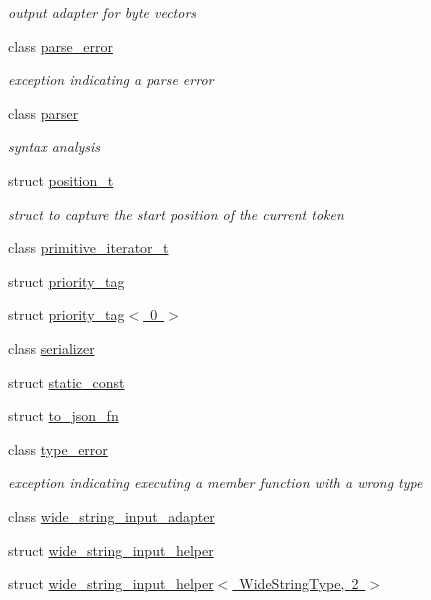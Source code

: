 \begin{DoxyCompactItemize}
\begin{DoxyCompactList}\small\item\em output adapter for byte vectors \end{DoxyCompactList}\item 
class \mbox{\hyperlink{classnlohmann_1_1detail_1_1parse__error}{parse\+\_\+error}}
\begin{DoxyCompactList}\small\item\em exception indicating a parse error \end{DoxyCompactList}\item 
class \mbox{\hyperlink{classnlohmann_1_1detail_1_1parser}{parser}}
\begin{DoxyCompactList}\small\item\em syntax analysis \end{DoxyCompactList}\item 
struct \mbox{\hyperlink{structnlohmann_1_1detail_1_1position__t}{position\+\_\+t}}
\begin{DoxyCompactList}\small\item\em struct to capture the start position of the current token \end{DoxyCompactList}\item 
class \mbox{\hyperlink{classnlohmann_1_1detail_1_1primitive__iterator__t}{primitive\+\_\+iterator\+\_\+t}}
\item 
struct \mbox{\hyperlink{structnlohmann_1_1detail_1_1priority__tag}{priority\+\_\+tag}}
\item 
struct \mbox{\hyperlink{structnlohmann_1_1detail_1_1priority__tag_3_010_01_4}{priority\+\_\+tag$<$ 0 $>$}}
\item 
class \mbox{\hyperlink{classnlohmann_1_1detail_1_1serializer}{serializer}}
\item 
struct \mbox{\hyperlink{structnlohmann_1_1detail_1_1static__const}{static\+\_\+const}}
\item 
struct \mbox{\hyperlink{structnlohmann_1_1detail_1_1to__json__fn}{to\+\_\+json\+\_\+fn}}
\item 
class \mbox{\hyperlink{classnlohmann_1_1detail_1_1type__error}{type\+\_\+error}}
\begin{DoxyCompactList}\small\item\em exception indicating executing a member function with a wrong type \end{DoxyCompactList}\item 
class \mbox{\hyperlink{classnlohmann_1_1detail_1_1wide__string__input__adapter}{wide\+\_\+string\+\_\+input\+\_\+adapter}}
\item 
struct \mbox{\hyperlink{structnlohmann_1_1detail_1_1wide__string__input__helper}{wide\+\_\+string\+\_\+input\+\_\+helper}}
\item 
struct \mbox{\hyperlink{structnlohmann_1_1detail_1_1wide__string__input__helper_3_01WideStringType_00_012_01_4}{wide\+\_\+string\+\_\+input\+\_\+helper$<$ Wide\+String\+Type, 2 $>$}}
\end{DoxyCompactItemize}
